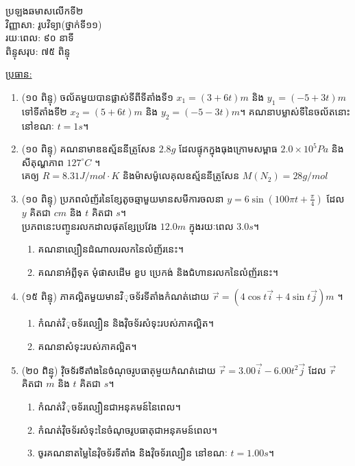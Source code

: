 \documentclass{officialexam}
\begin{document}
	\begin{center}
		\kml ប្រឡងឆមាសលើកទី២\\
		វិញ្ញាសា: រូបវិទ្យា(ថ្នាក់ទី១១)\\
		រយៈពេល: ៩០ នាទី\\
		ពិន្ទុសរុប: ៧៥ ពិន្ទុ
	\end{center}
	\begin{center}
		\underline{\kml \color{blue}ប្រធាន:}
	\end{center}
	\begin{enumerate}[I]
		\item (១០ ពិន្ទុ) ចល័តមួយបានផ្លាស់ទីពីទីតាំងទី១ $x_1=\left(3+6t\right)m$ និង $y_1=\left(-5+3t\right)m$ ទៅទីតាំងទី២ $x_2=\left(5+6t\right)m$ និង $y_2=\left(-5-3t\right)m$។
		គណនាបម្លាស់ទីនៃចល័តនោះនៅខណៈ $t=1s$។
		\item (១០ ពិន្ទុ) គណនាមាឌឧស្ម័ននីត្រូសែន $2.8g$ ដែលផ្ទុកក្នុងធុងក្រោមសម្ពាធ $2.0\times10^{5}Pa$ និងសីតុណ្ហភាព $127^\circ C$ ។ \\គេឲ្យ $R=8.31J/mol\cdot K$ និងម៉ាសម៉ូលេគុលឧស្ម័ននីត្រូសែន $M(N_2)=28g/mol$
		\item (១០ ពិន្ទុ) ប្រភពលំញ័រនៃខ្សែតូចឆ្មាមួយមានសមីការចលនា $y=6\sin\left(100\pi t+ \frac{\pi}{4}\right)$ ដែល $y$ គិតជា $cm$ និង $t$ គិតជា $s$។\\ ប្រភពនេះបញ្ចូនរលកដាលផុតខ្សែប្រវែង $12.0m$ ក្នុងរយៈពេល $3.0s$។
		\begin{enumerate}[k]
			\item គណនាល្បឿនដំណាលរលកនៃលំញ័រនេះ។
			\item គណនាអំព្លីទុត មុំផាសដើម ខួប ប្រេកង់ និងជំហានរលកនៃលំញ័រនេះ។
		\end{enumerate}
		\item (១៥ ពិន្ទុ) ភាគល្អិតមួយមានវិុចទ័រទីតាំងកំណត់ដោយ $\vec{r}=\left(4\cos t\vec{i}+4\sin t\vec{j}\right)m$ ។
		\begin{enumerate}[k]
			\item កំណត់វិុចទ័រល្បឿន និងវុិចទ័រសំទុះរបស់ភាគល្អិត។
			\item គណនាសំទុះរបស់ភាគល្អិត។
		\end{enumerate}
		\item (២០ ពិន្ទុ) វុិចទ័រទីតាំងនៃចំណុចរូបធាតុមួយកំណត់ដោយ $\vec{r}=3.00\vec{i}-6.00t^2\vec{j}$ ដែល $\vec{r}$ គិតជា $m$ និង $t$ គិតជា $s$។
		\begin{enumerate}[k]
			\item កំណត់វិុចទ័រល្បឿនជាអនុគមន៍នៃពេល។
			\item កំណត់វុិចទ័រសំទុះនៃចំណុចរូបធាតុជាអនុគមន៍ពេល។
			\item ចូរគណនាតម្លៃនៃវុិចទ័រទីតាំង និងវុិចទ័រល្បឿន នៅខណៈ $t=1.00s$។

\end{enumerate}
\end{enumerate}
\end{document}
